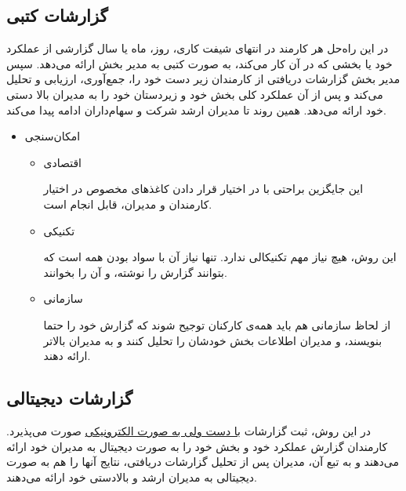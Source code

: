 \documentclass[12pt, dvipsnames, svgnames, x11names,]{article}
\begin{document}
\subsection{گزارشات کتبی }\label{written-report}
در این راه‌حل هر کارمند در انتهای شیفت کاری، روز، ماه یا سال گزارشی از عملکرد خود یا بخشی که در آن کار می‌کند، به صورت کتبی به مدیر بخش ارائه می‌دهد. سپس مدیر بخش گزارشات دریافتی از کارمندان زیر دست خود را، جمع‌آوری، ارزیابی و تحلیل می‌کند و پس از آن عملکرد کلی بخش خود و زیردستان خود را به مدیران بالا دستی خود ارائه می‌دهد.
همین روند تا مدیران ارشد شرکت و سهام‌داران ادامه پیدا می‌کند.

\begin{itemize}
    \item امکان‌سنجی
    
    \begin{itemize}
        \item 
        اقتصادی
        
        این جایگزین براحتی با در اختیار قرار دادن کاغذ‌های مخصوص در اختیار کارمندان و مدیران، قابل انجام است.
        \item 
        تکنیکی
        
        این روش، هیچ نیاز مهم تکنیکالی ندارد. تنها نیاز آن با سواد بودن همه است که بتوانند گزارش را نوشته، و آن را بخوانند.
        \item 
        سازمانی
        
        از لحاظ سازمانی هم باید همه‌ی کارکنان توجیح شوند که گزارش خود را حتما بنویسند، و مدیران اطلاعات بخش خودشان را تحلیل کنند و به مدیران بالاتر ارائه دهند.
    \end{itemize}
\end{itemize}
\subsection{گزارشات دیجیتالی }\label{half-digital}
در این روش، ثبت گزارشات \underline{با دست ولی به صورت الکترونیکی} صورت می‌پذیرد.
کارمندان گزارش عملکرد خود و بخش خود را به صورت دیجیتال به مدیران خود ارائه می‌دهند و به تبع آن، مدیران پس از تحلیل گزارشات دریافتی، نتایج آنها را هم به صورت دیجیتالی به مدیران ارشد و بالادستی خود ارائه می‌دهند.
\end{document}
